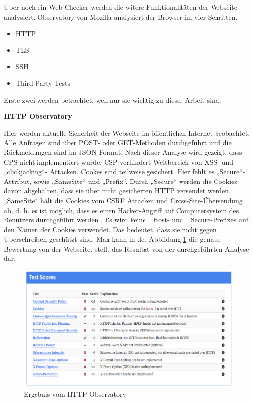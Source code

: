 Über noch ein Web-Checker werden die witere Funktionalitäten der Wrbseite analysiert. Observatory\cite[postnote]{bentley:1999} von Mozilla analysiert der Browser im vier Schritten. 

\begin{itemize}	
	\item \ac{HTTP}
	\item \ac{TLS}
	\item \ac{SSH}
	\item \ac{Third-Party Tests}
\end{itemize}

Erste zwei werden betrachtet, weil nur sie wichtig zu dieser Arbeit sind.

\pagebreak

\textbf{HTTP Observatory}

Hier werden aktuelle Sicherheit der Webseite im öffentlichen Internet beobachtet. Alle Anfragen sind über POST- oder GET-Methoden durchgeführt und die Rückmeldungen sind im JSON-Format.
Nach dieser Analyse wird gezeigt, dass \ac{CPS} nicht implementiert wurde. CSP verhindert Weitbereich von \ac{XSS}- und „clickjacking“- Attacken. 
Cookes sind teilweise gesichert. Hier fehlt es „Secure“-Attribut, sowie „SameSite“ und „Prefix“.  Durch „Secure“ werden die Cookies davon abgehalten, dass sie über nicht gesicherten HTTP versendet werden. „SameSite“ hält die Cookies vom \ac{CSRF} Attacken und Cross-Site-Übersendung ab, d. h. es ist möglich, dass es einen Hacker-Angriff auf Computersystem des Benutzers durchgeführt werden \cite[postnote]{bentley:1999}
. Es wird keine \_Host- und \_Secure-Prefixes auf den Namen der Cookies verwendet. Das bedeutet, dass sie nicht gegen Überschreiben geschützt sind. Man kann in der Abbildung \ref{fig: HTTP Observatory: Ergebnis} die genaue Bewertung von der Webseite.
 stellt das Resultat von der durchgeführten Analyse dar.
 
\begin{figure}[h]
	\centering
	\includegraphics[width=0.8\linewidth]{Graphics/eergebnisobser.png}
	\caption[Egebniss vom HTTP Observatory]{ Ergebnis vom HTTP Observatory }
	\label{fig: HTTP Observatory: Ergebnis}
\end{figure}


